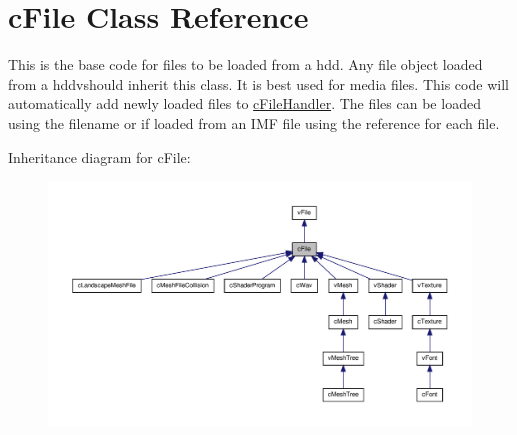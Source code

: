 \hypertarget{classc_file}{
\section{cFile Class Reference}
\label{classc_file}
}


This is the base code for files to be loaded from a hdd. Any file object loaded from a hddvshould inherit this class. It is best used for media files. This code will automatically add newly loaded files to \hyperlink{classc_file_handler}{cFileHandler}. The files can be loaded using the filename or if loaded from an IMF file using the reference for each file.  




Inheritance diagram for cFile:
\nopagebreak
\begin{figure}[H]
\begin{center}
\leavevmode
\includegraphics[width=400pt]{classc_file__inherit__graph}
\end{center}
\end{figure}



